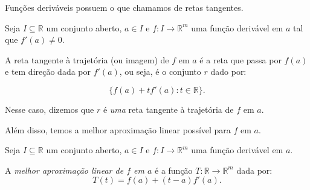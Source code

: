 Funções deriváveis possuem o que chamamos de retas tangentes.
\begin{definition}
    Seja $I\subseteq \mathbb R$ um conjunto aberto, $a \in I$ e $f: I\rightarrow \mathbb R^m$ uma função derivável em $a$ tal que $f'(a)\neq 0$.

    A reta tangente à trajetória (ou imagem) de $f$ em $a$ é a reta que passa por $f(a)$ e tem direção dada por $f'(a)$, ou seja, é o conjunto $r$ dado por:

    \begin{equation*}
        \{f(a) + t f'(a) : t \in \mathbb R\}.
    \end{equation*}

    Nesse caso, dizemos que $r$ é \emph{uma} reta tangente à trajetória de $f$ em $a$.
\end{definition}

Além disso, temos a melhor aproximação linear possível para $f$ em $a$.
\begin{definition}
    Seja $I\subseteq \mathbb R$ um conjunto aberto, $a \in I$ e $f: I\rightarrow \mathbb R^m$ uma função derivável em $a$.

    A \emph{melhor aproximação linear de $f$ em $a$} é a função $T: \mathbb R \to \mathbb R^m$ dada por:
    \begin{equation*}
        T(t) = f(a) + (t-a)f'(a).
    \end{equation*}
\end{definition}

